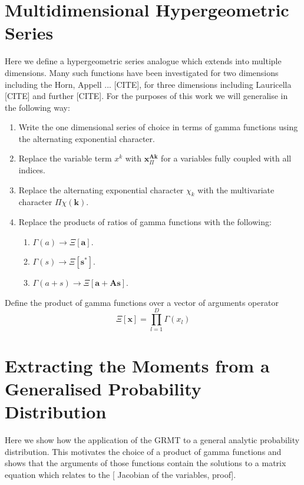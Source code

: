 \documentclass[journal=jcisd8,manuscript=article,layout=onecolumn,pdftex,floatfix,amsmath,amssymb,10pt]{achemso}
\begin{document}
\section{Multidimensional Hypergeometric Series}
Here we define a hypergeometric series analogue which extends into multiple dimensions. Many such functions have been investigated for two dimensions including the Horn, Appell ... [CITE], for three dimensions including Lauricella [CITE] and further [CITE]. For the purposes of this work we will generalise in the following way:

\begin{enumerate}
\item Write the one dimensional series of choice in terms of gamma functions using the alternating exponential character.
\item Replace the variable term $x^k$ with $\mathbf{x}^{\mathbf{A}\mathbf{k}}_\Pi$ for a variables fully coupled with all indices.
\item Replace the alternating exponential character $\chi_k$ with the multivariate character $\Pi\chi(\mathbf{k})$.
\item Replace the products of ratios of gamma functions with the following:
\begin{enumerate}
\item $\Gamma(a) \to \Xi[\mathbf{a}]$.
\item $\Gamma(s) \to \Xi[\mathbf{s}^*]$.
\item $\Gamma(a+s) \to \Xi[\mathbf{a}+\mathbf{A}\mathbf{s}]$.
\end{enumerate}
\end{enumerate}

Define the product of gamma functions over a vector of arguments operator
\begin{equation}
\Xi[\mathbf{x}] = \prod_{l=1}^D \Gamma(x_l)
\end{equation}


\section{Extracting the Moments from a Generalised Probability Distribution}
Here we show how the application of the GRMT to a general analytic probability distribution. This motivates the choice of a product of gamma functions and shows that the arguments of those functions contain the solutions to a matrix equation which relates to the [{\color{red} Jacobian of the variables}, proof].
\end{document}
